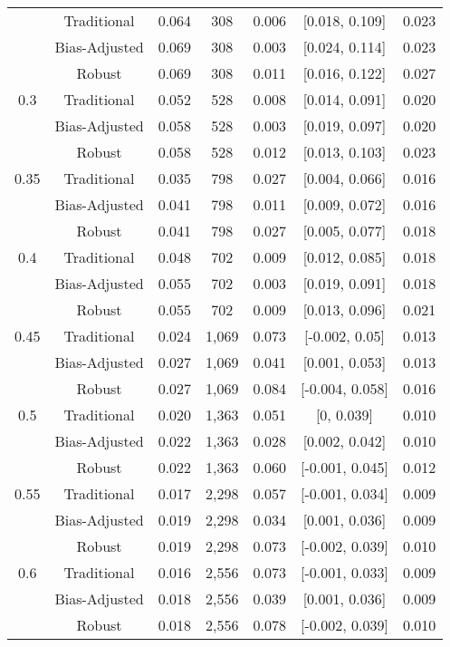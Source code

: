 \documentclass[
  12pt,
]{article}
\begin{document}
\begin{longtable}[t]{ccccccc}
\endfoot
\bottomrule
\endlastfoot
0.25 & Traditional & 0.064 & 308 & 0.006 & {}[0.018, 0.109] & 0.023\\
 & Bias-Adjusted & 0.069 & 308 & 0.003 & {}[0.024, 0.114] & 0.023\\
 & Robust & 0.069 & 308 & 0.011 & {}[0.016, 0.122] & 0.027\\
0.3 & Traditional & 0.052 & 528 & 0.008 & {}[0.014, 0.091] & 0.020\\
 & Bias-Adjusted & 0.058 & 528 & 0.003 & {}[0.019, 0.097] & 0.020\\
 & Robust & 0.058 & 528 & 0.012 & {}[0.013, 0.103] & 0.023\\
0.35 & Traditional & 0.035 & 798 & 0.027 & {}[0.004, 0.066] & 0.016\\
 & Bias-Adjusted & 0.041 & 798 & 0.011 & {}[0.009, 0.072] & 0.016\\
 & Robust & 0.041 & 798 & 0.027 & {}[0.005, 0.077] & 0.018\\
0.4 & Traditional & 0.048 & 702 & 0.009 & {}[0.012, 0.085] & 0.018\\
 & Bias-Adjusted & 0.055 & 702 & 0.003 & {}[0.019, 0.091] & 0.018\\
 & Robust & 0.055 & 702 & 0.009 & {}[0.013, 0.096] & 0.021\\
0.45 & Traditional & 0.024 & 1,069 & 0.073 & {}[-0.002, 0.05] & 0.013\\
 & Bias-Adjusted & 0.027 & 1,069 & 0.041 & {}[0.001, 0.053] & 0.013\\
 & Robust & 0.027 & 1,069 & 0.084 & {}[-0.004, 0.058] & 0.016\\
0.5 & Traditional & 0.020 & 1,363 & 0.051 & {}[0, 0.039] & 0.010\\
 & Bias-Adjusted & 0.022 & 1,363 & 0.028 & {}[0.002, 0.042] & 0.010\\
 & Robust & 0.022 & 1,363 & 0.060 & {}[-0.001, 0.045] & 0.012\\
0.55 & Traditional & 0.017 & 2,298 & 0.057 & {}[-0.001, 0.034] & 0.009\\
 & Bias-Adjusted & 0.019 & 2,298 & 0.034 & {}[0.001, 0.036] & 0.009\\
 & Robust & 0.019 & 2,298 & 0.073 & {}[-0.002, 0.039] & 0.010\\
0.6 & Traditional & 0.016 & 2,556 & 0.073 & {}[-0.001, 0.033] & 0.009\\
 & Bias-Adjusted & 0.018 & 2,556 & 0.039 & {}[0.001, 0.036] & 0.009\\
 & Robust & 0.018 & 2,556 & 0.078 & {}[-0.002, 0.039] & 0.010\\

\end{longtable}
\end{document}
